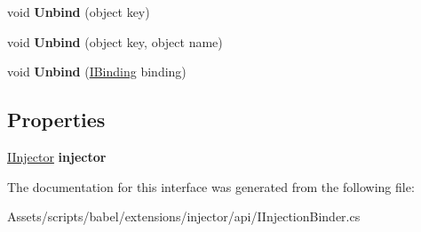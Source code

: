 \begin{DoxyCompactItemize}
\item 
\hypertarget{interfacebabel_1_1extensions_1_1injector_1_1api_1_1_i_injection_binder_ae1a4f1647fe445b18a88672f00c122d5}{void {\bfseries Unbind} (object key)}\label{interfacebabel_1_1extensions_1_1injector_1_1api_1_1_i_injection_binder_ae1a4f1647fe445b18a88672f00c122d5}

\item 
\hypertarget{interfacebabel_1_1extensions_1_1injector_1_1api_1_1_i_injection_binder_a238e7b1a25d0201b15e372a03c9d8f62}{void {\bfseries Unbind} (object key, object name)}\label{interfacebabel_1_1extensions_1_1injector_1_1api_1_1_i_injection_binder_a238e7b1a25d0201b15e372a03c9d8f62}

\item 
\hypertarget{interfacebabel_1_1extensions_1_1injector_1_1api_1_1_i_injection_binder_a56dc370f6faef7c9512c885a85ea6cde}{void {\bfseries Unbind} (\hyperlink{interfacebabel_1_1framework_1_1api_1_1_i_binding}{I\-Binding} binding)}\label{interfacebabel_1_1extensions_1_1injector_1_1api_1_1_i_injection_binder_a56dc370f6faef7c9512c885a85ea6cde}

\end{DoxyCompactItemize}
\subsection*{Properties}
\begin{DoxyCompactItemize}
\item 
\hypertarget{interfacebabel_1_1extensions_1_1injector_1_1api_1_1_i_injection_binder_a067f275cd952bed7af46bf590eeac477}{\hyperlink{interfacebabel_1_1extensions_1_1injector_1_1api_1_1_i_injector}{I\-Injector} {\bfseries injector}}\label{interfacebabel_1_1extensions_1_1injector_1_1api_1_1_i_injection_binder_a067f275cd952bed7af46bf590eeac477}

\end{DoxyCompactItemize}


The documentation for this interface was generated from the following file\-:\begin{DoxyCompactItemize}
\item 
Assets/scripts/babel/extensions/injector/api/I\-Injection\-Binder.\-cs\end{DoxyCompactItemize}
